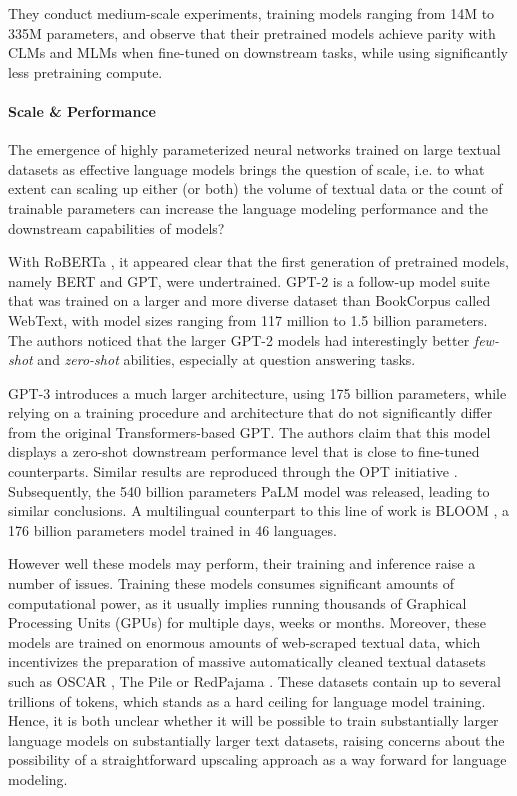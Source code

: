 They conduct medium-scale experiments, training models ranging from 14M to 335M parameters, and observe that their pretrained models achieve parity with CLMs and MLMs when fine-tuned on downstream tasks, while using significantly less pretraining compute.


\paragraph*{Scale \& Performance}
The emergence of highly parameterized neural networks trained on large textual datasets as effective language models brings the question of scale, i.e. to what extent can scaling up either (or both) the volume of textual data or the count of trainable parameters can increase the language modeling performance and the downstream capabilities of models?

With RoBERTa \citep{roberta}, it appeared clear that the first generation of pretrained models, namely BERT and GPT, were undertrained. GPT-2 \citep{gpt2} is a follow-up model suite that was trained on a larger and more diverse dataset than BookCorpus called WebText, with model sizes ranging from 117 million to 1.5 billion parameters. The authors noticed that the larger GPT-2 models had interestingly better \textit{few-shot} and \textit{zero-shot} abilities, especially at question answering tasks.

GPT-3 \citep{gpt3} introduces a much larger architecture, using 175 billion parameters, while relying on a training procedure and architecture that do not significantly differ from the original Transformers-based GPT. The authors claim that this model displays a zero-shot downstream performance level that is close to fine-tuned counterparts. Similar results are reproduced through the OPT initiative \citep{zhang2022opt}. Subsequently, the 540 billion parameters PaLM model \citep{palm} was released, leading to similar conclusions. A multilingual counterpart to this line of work is BLOOM \citep{le2023bloom}, a 176 billion parameters model trained in 46 languages.

However well these models may perform, their training and inference raise a number of issues. Training these models consumes significant amounts of computational power, as it usually implies running thousands of Graphical Processing Units (GPUs) for multiple days, weeks or months. Moreover, these models are trained on enormous amounts of web-scraped textual data, which incentivizes the preparation of massive automatically cleaned textual datasets such as OSCAR \citep{oscar}, The Pile \citep{gao2020pile} or RedPajama \citep{together2023redpajama}. These datasets contain up to several trillions of tokens, which stands as a hard ceiling for language model training. Hence, it is both unclear whether it will be possible to train substantially larger language models on substantially larger text datasets, raising concerns about the possibility of a straightforward upscaling approach as a way forward for language modeling.

